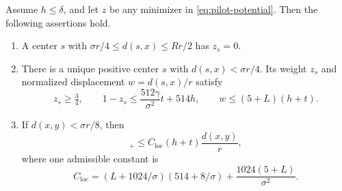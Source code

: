 \begin{lemma}
\label{lem:pilot-local}
Assume $h\le\delta$, and let $z$ be any minimizer in
\eqref{eq:pilot-potential}.  Then the following assertions hold.
\begin{enumerate}
\item A center $s$ with $\sigma r/4\le d(s,x)\le Rr/2$ has $z_s=0$.
\item There is a unique positive center $s$ with $d(s,x)<\sigma r/4$.
      Its weight $z_s$ and normalized displacement $w=d(s,x)/r$ satisfy
      \begin{equation}
       z_s\ge\tfrac34,\qquad
       1-z_s\le\frac{512\gamma}{\sigma^2}t+514h,
       \qquad w\le(5+L)(h+t).
       \label{eq:pilot-local-structure}
      \end{equation}
\item If $d(x,y)<\sigma r/8$, then
      \begin{equation}
       [F_z^g(x)-F_z^g(y)]_+
          \le C_{\mathrm{loc}}(h+t)\frac{d(x,y)}r,
       \label{eq:pilot-local-slope}
      \end{equation}
      where one admissible constant is
      \begin{equation}
       C_{\mathrm{loc}}
       =(L+1024/\sigma)(514+8/\sigma)
           +\frac{1024(5+L)}{\sigma^2}.
       \label{eq:pilot-local-constant}
      \end{equation}
\end{enumerate}
\end{lemma}

